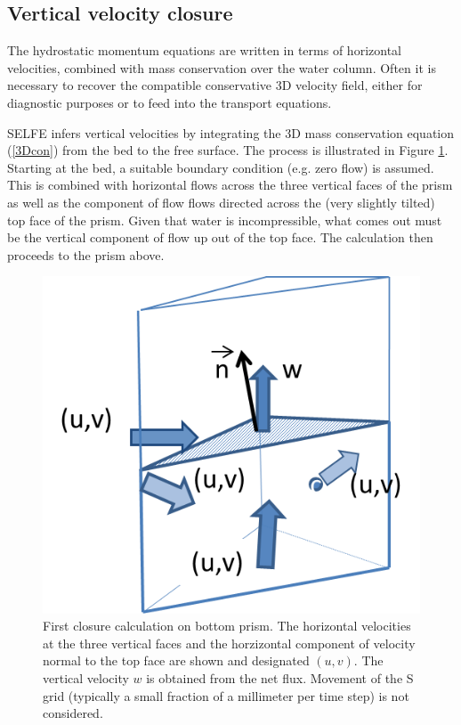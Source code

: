 \subsection{Vertical velocity closure}
The hydrostatic momentum equations are written in terms of horizontal velocities, combined with mass conservation over the water column. Often it is necessary to recover the compatible conservative 3D velocity field, either for diagnostic purposes or to feed into the transport equations. 

SELFE infers vertical velocities by integrating the 3D mass conservation equation (\ref{3Dcon})
from the bed to the free surface. The process is illustrated in Figure \ref{fig:vel_close}. Starting at the bed, a suitable boundary condition (e.g. zero flow) is assumed. This is combined with horizontal flows across the three vertical faces of the prism as well as the component of flow flows directed across the (very slightly tilted) top face of the
prism. Given that water is incompressible, what comes out must be the vertical component of flow up out of the top face. The
calculation then proceeds to the prism above.

\begin{figure}
	\centering
		\includegraphics[scale=1.0]{image/vel_closure}
	\caption{First closure calculation on bottom prism. The horizontal velocities at the three vertical faces and the horzizontal component of velocity normal to the top face are shown and designated $(u,v)$. The vertical velocity $w$ is obtained from the 
	net flux. Movement of the S grid (typically a small fraction of a millimeter per time step) is not considered.}
	\label{fig:vel_close}
\end{figure}